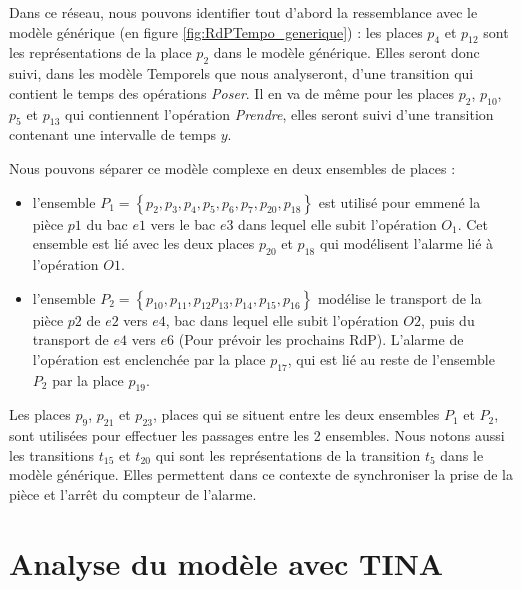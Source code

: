 Dans ce réseau, nous pouvons identifier tout d'abord la ressemblance avec le modèle générique (en figure \ref{fig:RdPTempo_generique}) : les places $p_4$ et $p_{12}$ sont les représentations de la place $p_2$ dans le modèle générique. Elles seront donc suivi, dans les modèle Temporels que nous analyseront, d'une transition qui contient le temps des opérations \emph{Poser}. Il en va de même pour les places $p_2$, $p_{10}$, $p_{5}$ et $p_{13}$ qui contiennent l'opération \emph{Prendre}, elles seront suivi d'une transition contenant une intervalle de temps $y$.


Nous pouvons séparer ce modèle complexe en deux ensembles de places : \begin{itemize}
\item l'ensemble $P_1 =\left\lbrace p_2,p_3,p_4,p_5,p_6,p_7,p_{20},p_{18}\right\rbrace$ est utilisé pour emmené la pièce $p1$ du bac $e1$ vers le bac $e3$ dans lequel elle subit l'opération $O_1$. Cet ensemble est lié avec les deux places $p_{20}$ et $p_{18}$ qui modélisent l'alarme lié à l'opération $O1$.
\item  l'ensemble $P_2 =\left\lbrace p_{10}, p_{11}, p_{12} p_{13}, p_{14}, p_{15}, p_{16}\right\rbrace$ modélise le transport de la pièce $p2$ de $e2$ vers $e4$, bac dans lequel elle subit l'opération $O2$, puis du transport de $e4$ vers $e6$ (Pour prévoir les prochains RdP). L'alarme de l'opération est enclenchée par la place $p_{17}$, qui est lié au reste de l'ensemble $P_2$ par la place $p_{19}$.
\end{itemize}

Les places $p_9$, $p_{21}$ et $p_{23}$, places qui se situent entre les deux ensembles $P_1$ et $P_2$, sont utilisées pour effectuer les passages entre les 2 ensembles. Nous notons aussi les transitions $t_{15}$ et $t_{20}$ qui sont les représentations de la transition $t_5$ dans le modèle générique. Elles permettent dans ce contexte de synchroniser la prise de la pièce et l'arrêt du compteur de l'alarme. 

\section{Analyse du modèle avec TINA}